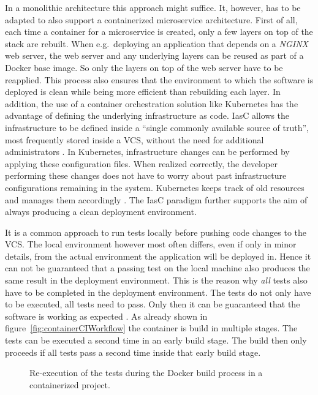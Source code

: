 In a monolithic architecture this approach might suffice. It, however, has to
be adapted to also support a containerized microservice architecture. First of
all, each time a container for a microservice is created, only a few layers on
top of the stack are rebuilt. When e.g.\ deploying an application that depends
on a \textit{NGINX} web server, the web server and any underlying layers can
be reused as part of a Docker base image. So only the layers on top of the web
server have to be reapplied. This process also ensures that the environment to
which the software is deployed is clean while being more efficient
than rebuilding each layer. In addition, the use of a container orchestration
solution like Kubernetes has the advantage of defining the underlying
infrastructure as code. \ac{IasC} allows the infrastructure to be defined
inside a \enquote{single commonly available source of truth}, most frequently
stored inside a \ac{VCS}, without the need for additional administrators
\autocite{ArtacDevOpsIntroducingInfrastructure2017}. In Kubernetes,
infrastructure changes can be performed by applying these configuration files.
When realized correctly, the developer performing these changes does not have
to worry about past infrastructure configurations remaining in the system.
Kubernetes keeps track of old resources and manages them accordingly
\autocite{AuthorsDeployments2019}. The \ac{IasC} paradigm further supports the
aim of always producing a clean deployment environment.

It is a common approach to run tests locally before pushing code changes to the
\ac{VCS}. The local environment however most often differs, even if only in
minor details, from the actual environment the application will be deployed in.
Hence it can not be guaranteed that a passing test on the local machine also
produces the same result in the deployment environment. This is the reason why
\textit{all} tests also have to be completed in the deployment environment. The
tests do not only have to be executed, all tests need to pass. Only then it can
be guaranteed that the software is working as expected \autocite[p.
196]{MatyasContinuousIntegration2007}. As already shown in
figure~\ref{fig:containerCIWorkflow} the container is build in multiple stages.
The tests can be executed a second time in an early build stage. The build then
only proceeds if all tests pass a second time inside that early build stage.

\begin{figure}[H]
\begin{center}
\end{center}
\caption{Re-execution of the tests during the Docker build process in a
containerized project.}%
\label{fig:containerCIWorkflowExtended}
\end{figure}


